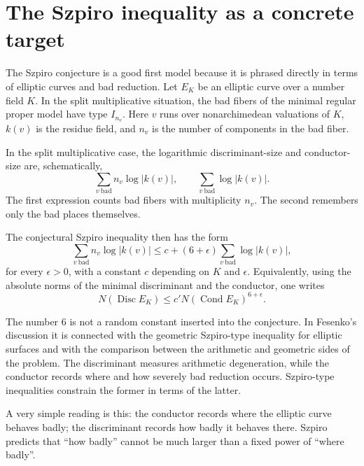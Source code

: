 \section{The Szpiro inequality as a concrete target}

The Szpiro conjecture is a good first model because it is phrased directly in terms of elliptic curves and bad reduction.  Let \(E_K\) be an elliptic curve over a number field \(K\).  In the split multiplicative situation, the bad fibers of the minimal regular proper model have type \(I_{n_v}\).  Here \(v\) runs over nonarchimedean valuations of \(K\), \(k(v)\) is the residue field, and \(n_v\) is the number of components in the bad fiber.

\begin{definition}
In the split multiplicative case, the logarithmic discriminant-size and conductor-size are, schematically,
\[
  \sum_{v\ \mathrm{bad}} n_v\log |k(v)|,
  \qquad
  \sum_{v\ \mathrm{bad}} \log |k(v)|.
\]
The first expression counts bad fibers with multiplicity \(n_v\).  The second remembers only the bad places themselves.
\end{definition}

The conjectural Szpiro inequality then has the form
\[
  \sum_{v\ \mathrm{bad}} n_v\log |k(v)|
  \leq
  c+(6+\epsilon)\sum_{v\ \mathrm{bad}}\log |k(v)|,
\]
for every \(\epsilon>0\), with a constant \(c\) depending on \(K\) and \(\epsilon\).  Equivalently, using the absolute norms of the minimal discriminant and the conductor, one writes
\[
  N(\operatorname{Disc}E_K)
  \leq
  c' N(\operatorname{Cond}E_K)^{6+\epsilon}.
\]

\begin{remark}
The number \(6\) is not a random constant inserted into the conjecture.  In Fesenko's discussion it is connected with the geometric Szpiro-type inequality for elliptic surfaces and with the comparison between the arithmetic and geometric sides of the problem.  The discriminant measures arithmetic degeneration, while the conductor records where and how severely bad reduction occurs. Szpiro-type inequalities constrain the former in terms of the latter.
\end{remark}

A very simple reading is this: the conductor records where the elliptic curve behaves badly; the discriminant records how badly it behaves there.  Szpiro predicts that ``how badly'' cannot be much larger than a fixed power of ``where badly''.

